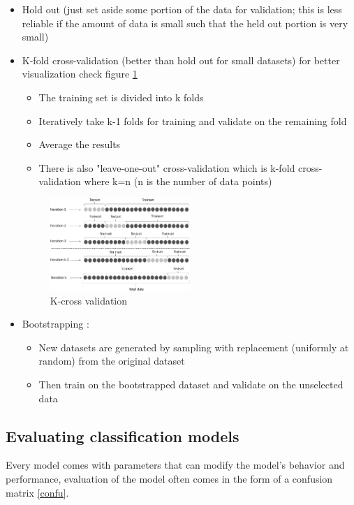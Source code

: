 \begin{itemize}
\item Hold out (just set aside some portion of the data for validation; this is less reliable if the amount of data is small such that the held out portion is very small) 
\item K-fold cross-validation (better than hold out for small datasets) for better visualization  check figure \ref{fig:cross}
\begin{itemize}
\item The training set is divided into k folds
\item Iteratively take k-1 folds for training and validate on the remaining fold
\item Average the results
\item There is also "leave-one-out" cross-validation which is k-fold cross-validation where k=n (n is the number of data points)
\end{itemize}

\begin{figure}[H]
\centering
\includegraphics[width=0.5\textwidth]{img/cross.png}
\caption{K-cross validation }
\label{fig:cross}
\end{figure}

\item Bootstrapping : 
\begin{itemize}
\item New datasets are generated by sampling with replacement (uniformly at random) from the original dataset
\item Then train on the bootstrapped dataset and validate on the unselected data
\end{itemize}
\end{itemize}

\subsection{Evaluating classification models}\label{eva}
Every model comes with parameters that can modify the model's behavior and performance, evaluation of the model  often comes in the form of a confusion matrix \ref{confu}.

